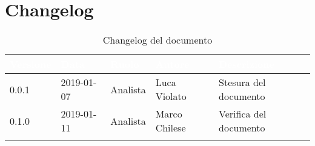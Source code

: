 \newpage

\section{Changelog}

\begin{center}
\begin{longtable}[c]{|m{}|m{}|m{}|m{}|p{}|}
\hline
\rowcolor{bluelogo}\textbf{\textcolor{white}{Versione}} & \textbf{\textcolor{white}{Data}} & \textbf{\textcolor{white}{Ruolo}} & \textbf{\textcolor{white}{Autore}} & \textbf{\textcolor{white}{Descrizione}}\\
\hline \hline
\endfirsthead
0.0.1 & 2019-01-07 & Analista & Luca Violato & Stesura del documento \\
0.1.0 & 2019-01-11 & Analista & Marco Chilese & Verifica del documento \\
\hline
\caption{Changelog del documento}
\end{longtable}
\end{center}
